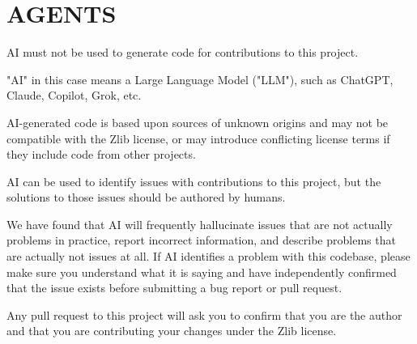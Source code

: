 \chapter{AGENTS }
\hypertarget{md__mono_runtime_2extern_2sdl_2_a_g_e_n_t_s}{}\label{md__mono_runtime_2extern_2sdl_2_a_g_e_n_t_s}
AI must not be used to generate code for contributions to this project.

"{}\+AI"{} in this case means a Large Language Model ("{}\+LLM"{}), such as Chat\+GPT, Claude, Copilot, Grok, etc.

AI-\/generated code is based upon sources of unknown origins and may not be compatible with the Zlib license, or may introduce conflicting license terms if they include code from other projects.

AI can be used to identify issues with contributions to this project, but the solutions to those issues should be authored by humans.

We have found that AI will frequently hallucinate issues that are not actually problems in practice, report incorrect information, and describe problems that are actually not issues at all. If AI identifies a problem with this codebase, please make sure you understand what it is saying and have independently confirmed that the issue exists before submitting a bug report or pull request.

Any pull request to this project will ask you to confirm that you are the author and that you are contributing your changes under the Zlib license. 